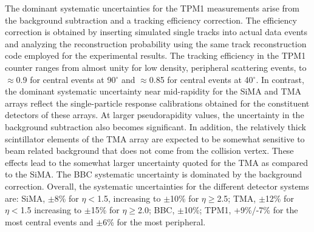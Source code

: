\documentclass[singlespacing]{elsart}
\begin{document}
The dominant systematic uncertainties  for
the TPM1 measurements arise from the background
subtraction and a tracking efficiency
correction. 
The efficiency correction is obtained by inserting simulated
single tracks into actual data events and analyzing 
the reconstruction probability using the same
track reconstruction code employed for the experimental results. 
The tracking
efficiency in the TPM1 counter ranges from almost 
unity for low density, peripheral scattering events, 
to $\approx$0.9 for central events at 90$^\circ$ and $\approx$0.85
for central events at 40$^\circ$.
In contrast, the dominant systematic uncertainty near mid-rapidity for
the SiMA and TMA arrays reflect the single-particle
response calibrations obtained for the
constituent  detectors of these arrays. 
At larger pseudorapidity values, the uncertainty in the background
subtraction also becomes significant. 
In addition, the relatively thick 
scintillator elements of the TMA array are expected to be somewhat
sensitive to
beam related background that does not come from the collision vertex.   
These effects lead to the somewhat larger uncertainty quoted for the TMA as 
compared to the SiMA.
The BBC systematic uncertainty is dominated by the background 
correction.  Overall, the systematic uncertainties for the 
different detector
systems are: SiMA, $\pm$8\% for $\eta$$<$1.5, increasing to
$\pm$10\% for $\eta\ge$2.5; TMA, $\pm$12\% for $\eta<$1.5 increasing to
$\pm$15\% for $\eta\ge$2.0; BBC, $\pm$10\%; TPM1, +9\%/-7\% for the 
most central events and $\pm$6\% for the most peripheral. 
\end{document}
